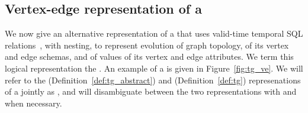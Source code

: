 \subsection{Vertex-edge representation of a \tg}
\label{sec:model:ve}

We now give an alternative representation of a \tg that uses
valid-time temporal SQL relations~\cite{DBLP:conf/vldb/BohlenSS96},
with nesting, to represent evolution of graph topology, of its vertex
and edge schemas, and of values of its vertex and edge attributes.  We
term this logical representation the {\em \ve \tg}.  An example of a
\ve \tg is given in Figure~\ref{fig:tg_ve}.  We will refer to the \rgs
(Definition~\ref{def:tg_abstract}) and \ve (Definition~\ref{def:tg})
represenations of a \tg jointly as , and will disambiguate
between the two representations with \trg and \tve when necessary.


